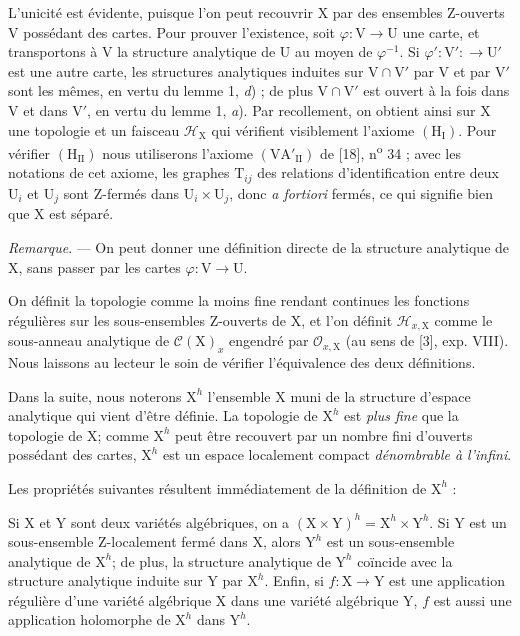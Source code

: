L'unicité est évidente, puisque l'on peut recouvrir $\mathrm{X}$ par des ensembles Z-ouverts $\mathrm{V}$ possédant des cartes. Pour prouver l'existence, soit $\varphi : \mathrm{V} \to \mathrm{U}$ une carte, et transportons à $\mathrm{V}$ la structure analytique de $\mathrm{U}$ au moyen de $\varphi^{-1}$. Si $\varphi' : \mathrm{V}' : \to \mathrm{U}'$ est une autre carte, les structures analytiques induites sur $\mathrm{V} \cap \mathrm{V}'$ par $\mathrm{V}$ et par $\mathrm{V}'$ sont les mêmes, en vertu du lemme 1, \textit{d}) ; de plus $\mathrm{V} \cap \mathrm{V}'$ est ouvert à la fois dans $\mathrm{V}$ et dans $\mathrm{V}'$, en vertu du lemme 1, \textit{a}). Par recollement, on obtient ainsi sur $\mathrm{X}$ une topologie et un faisceau $\mathcal{H}_{\mathrm{X}}$ qui vérifient visiblement l'axiome $(\mathrm{H}_{\mathrm{I}})$. Pour vérifier $(\mathrm{H}_{\mathrm{II}})$ nous utiliserons l'axiome $(\mathrm{VA}'_{\mathrm{II}})$ de [18], n\textsuperscript{o} 34 ; avec les notations de cet axiome, les graphes $\mathrm{T}_{ij}$ des relations d'identification entre deux $\mathrm{U}_i$ et $\mathrm{U}_j$ sont Z-fermés dans $\mathrm{U}_i \times \mathrm{U}_j$, donc \textit{a fortiori} fermés, ce qui signifie bien que $\mathrm{X}$ est séparé.

\textit{Remarque}. --- On peut donner une définition directe de la structure analytique de $\mathrm{X}$, sans passer par les cartes $\varphi : \mathrm{V} \to \mathrm{U}$.



On définit la topologie comme la moins fine rendant continues les fonctions régulières sur les sous-ensembles Z-ouverts de $\mathrm{X}$, et l'on définit $\mathcal{H}_{x,\mathrm{X}}$ comme le sous-anneau analytique de $\mathcal{C}(\mathrm{X})_x$ engendré par $\mathcal{O}_{x,\mathrm{X}}$ (au sens de [3], exp. VIII). Nous laissons au lecteur le soin de vérifier l'équivalence des deux définitions.

Dans la suite, nous noterons $\mathrm{X}^h$ l'ensemble $\mathrm{X}$ muni de la structure d'espace analytique qui vient d'être définie. La topologie de $\mathrm{X}^h$ est \textit{plus fine} que la topologie de $\mathrm{X}$; comme $\mathrm{X}^h$ peut être recouvert par un nombre fini d'ouverts possédant des cartes, $\mathrm{X}^h$ est un espace localement compact \textit{dénombrable à l'infini}.

Les propriétés suivantes résultent immédiatement de la définition de $\mathrm{X}^h$ :

Si $\mathrm{X}$ et $\mathrm{Y}$ sont deux variétés algébriques, on a $(\mathrm{X} \times \mathrm{Y})^h = \mathrm{X}^h \times \mathrm{Y}^h$. Si $\mathrm{Y}$ est un sous-ensemble Z-localement fermé dans $\mathrm{X}$, alors $\mathrm{Y}^h$ est un sous-ensemble analytique de $\mathrm{X}^h$; de plus, la structure analytique de $\mathrm{Y}^h$ coïncide avec la structure analytique induite sur $\mathrm{Y}$ par $\mathrm{X}^h$. Enfin, si $f : \mathrm{X} \to \mathrm{Y}$ est une application régulière d'une variété algébrique $\mathrm{X}$ dans une variété algébrique $\mathrm{Y}$, $f$ est aussi une application holomorphe de $\mathrm{X}^h$ dans $\mathrm{Y}^h$.


